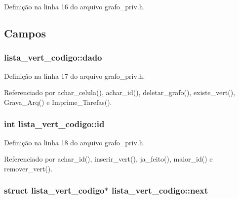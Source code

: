 Definição na linha 16 do arquivo grafo\+\_\+priv.\+h.



\subsection{Campos}
\hypertarget{structlista__vert__codigo_a8e51b3141307b34cb74d6433a136f73b}{}
\subsubsection[{dado}]{ lista\+\_\+vert\+\_\+codigo\+::dado}\label{structlista__vert__codigo_a8e51b3141307b34cb74d6433a136f73b}


Definição na linha 17 do arquivo grafo\+\_\+priv.\+h.



Referenciado por achar\+\_\+celula(), achar\+\_\+id(), deletar\+\_\+grafo(), existe\+\_\+vert(), Grava\+\_\+\+Arq() e Imprime\+\_\+\+Tarefas().

\hypertarget{structlista__vert__codigo_acc7c3bce66ab242ba6e64e763dfb63b3}{}
\subsubsection[{id}]{\setlength{\rightskip}{0pt plus 5cm}int lista\+\_\+vert\+\_\+codigo\+::id}\label{structlista__vert__codigo_acc7c3bce66ab242ba6e64e763dfb63b3}


Definição na linha 18 do arquivo grafo\+\_\+priv.\+h.



Referenciado por achar\+\_\+id(), inserir\+\_\+vert(), ja\+\_\+feito(), maior\+\_\+id() e remover\+\_\+vert().

\hypertarget{structlista__vert__codigo_af1cac7f22cb6142a13bd1f9c41f4c0b5}{}
\subsubsection[{next}]{\setlength{\rightskip}{0pt plus 5cm}struct {\bf lista\+\_\+vert\+\_\+codigo}$\ast$ lista\+\_\+vert\+\_\+codigo\+::next}\label{structlista__vert__codigo_af1cac7f22cb6142a13bd1f9c41f4c0b5}


